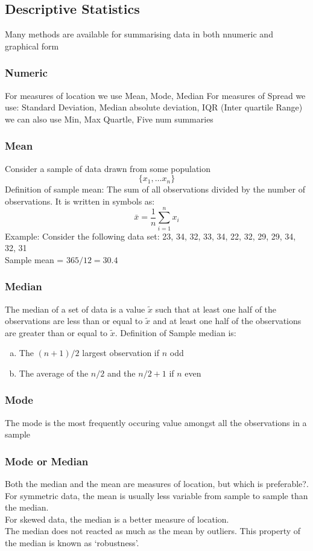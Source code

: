 \documentclass[twoside]{article}
\theoremstyle{definition}
\theoremstyle{definition}
\begin{document}
\subsection{Descriptive Statistics}
Many methods are available for summarising data in both nnumeric and graphical form
\subsubsection{Numeric}
For measures of location we use Mean, Mode, Median
For measures of Spread we use: Standard Deviation, Median absolute deviation, IQR (Inter quartile Range)
we can also use Min, Max Quartle, Five num summaries
\subsubsection{Mean}
Consider a sample of data drawn from some population
\begin{equation}
  \{x_1, \dots x_n\}
\end{equation}
Definition of sample mean: The sum of all observations divided by the number of observations. It is written in symbols as:
\begin{equation}
  \bar{x} = \frac{1}{n} \sum_{i=1}^{n} x_i
\end{equation}
Example:
Consider the following data set:
23, 34, 32, 33, 34, 22, 32, 29, 29, 34, 32, 31 \\
Sample mean = $365 / 12 = 30.4$
\subsubsection{Median}
The median of a set of data is a value $\tilde{x}$ such that at least one half of the observations are less than or equal to $\tilde{x}$ and at least one half of the observations are greater than or equal to $\tilde{x}$. 
Definition of Sample median is:
\begin{enumerate}[(a)]
\item The $(n+1)/2$ largest observation if $n$ odd
\item The average of the $n/2$ and the $n/2 + 1$ if $n$ even

\end{enumerate}
\subsubsection{Mode}
The mode is the most frequently occuring value amongst all the observations in a sample
\subsubsection{Mode or Median}
Both the median and the mean are measures of location, but which
is preferable?. \\
For symmetric data, the mean is usually less variable from sample
to sample than the median.\\
For skewed data, the median is a better measure of location.\\
The median does not reacted as much as the mean by outliers. This
property of the median is known as ‘robustness’.
\end{document}
